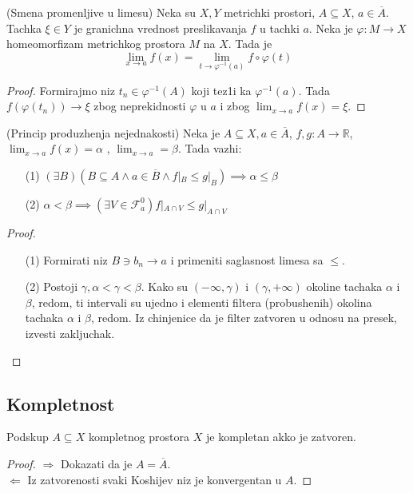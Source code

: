 \documentclass[a4paper,12pt]{article}
\newcommand{\RR}{\mathbb{R}}
\newcommand{\psj}{\subseteq}
\begin{document}
\begin{tvr}
(Smena promenljive u limesu) Neka su $X, Y$ metrichki prostori, $A \psj X$, $a \in \overline{A}$. Tachka $\xi \in Y$ je granichna vrednost preslikavanja $f$ u tachki $a$. Neka je $\varphi: M \to X$ homeomorfizam metrichkog prostora $M$ na $X$. Tada je 
\[\lim_{x \to a} f(x) = \lim_{t \to {\varphi}^{-1}(a)} f \circ \varphi(t)\]
\end{tvr}
\begin{proof}
Formirajmo niz $t_n \in \varphi^{-1} (A)$ koji tez1i ka $\varphi^{-1}(a)$. Tada $f(\varphi(t_n)) \to \xi$ zbog nepre\-kidnosti $\varphi$ u $a$ i zbog $\lim_{x \to a} f(x) = \xi$.
\end{proof}

\begin{tvr}(Princip produzhenja nejednakosti)
	Neka je $A\psj X, a\in \overline A$, $f,g:A\to \RR$, \( \lim_{x\to a}f(x) = \alpha \) , \( \lim_{x\to a} = \beta \). Tada vazhi:
	\begin{enumerate}
		\item[(1)] $(\exists B)(B\psj A \land a \in \overline B \land f|_B \leq g|_B) \implies \alpha \leq \beta$
		\item[(2)] $\alpha < \beta \implies (\exists V \in \mathcal F _a^{0})f|_{A \cap V} \leq g|_{A\cap V}$
	\end{enumerate}
\end{tvr}
\begin{proof}
	\begin{enumerate}
		\item[(1)] Formirati niz $B \ni b_n \to a$ i primeniti saglasnost limesa sa $\leq$.
		\item[(2)] Postoji $\gamma, \alpha < \gamma < \beta$. Kako su $(-\infty, \gamma)$ i $(\gamma, +\infty)$ okoline tachaka $\alpha$ i $\beta$, redom,
			ti intervali su ujedno i elementi filtera (probushenih) okolina tachaka $\alpha$ i $\beta$, redom. Iz chinjenice da je filter zatvoren u odnosu
			na presek, izvesti zakljuchak.
	\end{enumerate}

\end{proof}

\subsection{Kompletnost}

\begin{tvr}
Podskup $A \psj X$ kompletnog prostora $X$ je kompletan akko je zatvoren.
\end{tvr}
\begin{proof}
$\boxed{\Rightarrow}$ Dokazati da je $A = \overline{A}$.\\
$\boxed{\Leftarrow}$ Iz zatvorenosti svaki Koshijev niz je konvergentan u $A$.
\end{proof}
\end{document}
